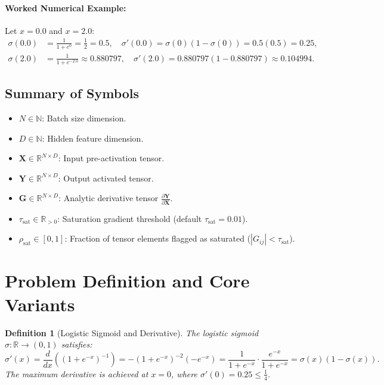 \documentclass[11pt]{article}
\newtheorem{definition}{Definition}
\begin{document}
\paragraph{Worked Numerical Example:}
Let $x = 0.0$ and $x = 2.0$:
\begin{align}
\sigma(0.0) &= \frac{1}{1 + e^0} = \frac{1}{2} = 0.5, \quad \sigma'(0.0) = \sigma(0)(1 - \sigma(0)) = 0.5(0.5) = 0.25, \\
\sigma(2.0) &= \frac{1}{1 + e^{-2.0}} \approx 0.880797, \quad \sigma'(2.0) = 0.880797(1 - 0.880797) \approx 0.104994.
\end{align}

\subsection{Summary of Symbols}
\begin{itemize}
    \item $N \in \mathbb{N}$: Batch size dimension.
    \item $D \in \mathbb{N}$: Hidden feature dimension.
    \item $\mathbf{X} \in \mathbb{R}^{N \times D}$: Input pre-activation tensor.
    \item $\mathbf{Y} \in \mathbb{R}^{N \times D}$: Output activated tensor.
    \item $\mathbf{G} \in \mathbb{R}^{N \times D}$: Analytic derivative tensor $\frac{\partial \mathbf{Y}}{\partial \mathbf{X}}$.
    \item $\tau_{\text{sat}} \in \mathbb{R}_{>0}$: Saturation gradient threshold (default $\tau_{\text{sat}} = 0.01$).
    \item $\rho_{\text{sat}} \in [0, 1]$: Fraction of tensor elements flagged as saturated ($|G_{ij}| < \tau_{\text{sat}}$).
\end{itemize}

\section{Problem Definition and Core Variants}
\label{sec:problem_definition}

\begin{definition}[Logistic Sigmoid and Derivative]
The logistic sigmoid $\sigma: \mathbb{R} \to (0, 1)$ satisfies:
\begin{equation}
\sigma'(x) = \frac{d}{dx} \left( (1 + e^{-x})^{-1} \right) = -(1 + e^{-x})^{-2} (-e^{-x}) = \frac{1}{1 + e^{-x}} \cdot \frac{e^{-x}}{1 + e^{-x}} = \sigma(x)(1 - \sigma(x)).
\end{equation}
The maximum derivative is achieved at $x = 0$, where $\sigma'(0) = 0.25 \le \frac{1}{4}$.
\end{definition}
\end{document}
